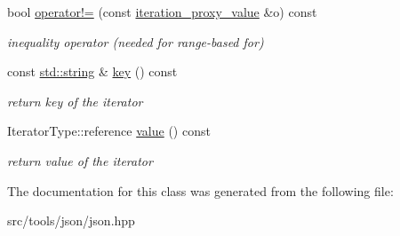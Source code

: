 \begin{DoxyCompactItemize}
\mbox{\label{classnlohmann_1_1detail_1_1iteration__proxy__value_a646dbb2b1842f44f42ee1e14245b8595}} 
bool \hyperlink{classnlohmann_1_1detail_1_1iteration__proxy__value_a646dbb2b1842f44f42ee1e14245b8595}{operator!=} (const \hyperlink{classnlohmann_1_1detail_1_1iteration__proxy__value}{iteration\+\_\+proxy\+\_\+value} \&o) const
\begin{DoxyCompactList}\small\item\em inequality operator (needed for range-\/based for) \end{DoxyCompactList}\item 
\mbox{\label{classnlohmann_1_1detail_1_1iteration__proxy__value_a614278e2eecdf088199fac275ce114b6}} 
const \hyperlink{namespacenlohmann_1_1detail_a1ed8fc6239da25abcaf681d30ace4985ab45cffe084dd3d20d928bee85e7b0f21}{std\+::string} \& \hyperlink{classnlohmann_1_1detail_1_1iteration__proxy__value_a614278e2eecdf088199fac275ce114b6}{key} () const
\begin{DoxyCompactList}\small\item\em return key of the iterator \end{DoxyCompactList}\item 
\mbox{\label{classnlohmann_1_1detail_1_1iteration__proxy__value_ab8e33bd01c285a1a80b737a1905ceb97}} 
Iterator\+Type\+::reference \hyperlink{classnlohmann_1_1detail_1_1iteration__proxy__value_ab8e33bd01c285a1a80b737a1905ceb97}{value} () const
\begin{DoxyCompactList}\small\item\em return value of the iterator \end{DoxyCompactList}\end{DoxyCompactItemize}


The documentation for this class was generated from the following file\+:\begin{DoxyCompactItemize}
\item 
src/tools/json/json.\+hpp\end{DoxyCompactItemize}
